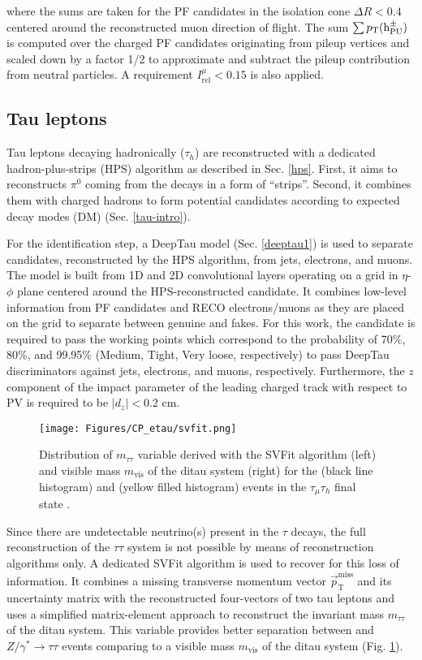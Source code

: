 where the sums are taken for the PF candidates in the isolation cone $\Delta R < 0.4$ centered around the reconstructed muon direction of flight. The sum $\sum p_{\text{T}}(\text{h}^\pm_{\text{PU}})$ is computed over the charged PF candidates originating from pileup vertices and scaled down by a factor 1/2 to approximate and subtract the pileup contribution from neutral particles. A requirement $I^\mu_{\text{rel}} < 0.15$ is also applied.  

\subsection{Tau leptons}\label{sec:reco_tau}
Tau leptons decaying hadronically ($\tau_h$) are reconstructed with a dedicated hadron-plus-strips (HPS) algorithm as described in Sec. \ref{hps}. First, it aims to reconstructs $\pi^0$ coming from the \tauh decays in a form of \enquote{strips}. Second, it combines them with charged hadrons to form potential \tauh candidates according to expected decay modes (DM) (Sec. \ref{tau-intro}).

For the identification step, a DeepTau model (Sec. \ref{deeptau1}) is used to separate \tauh candidates, reconstructed by the HPS algorithm, from jets, electrons, and muons. The model is built from 1D and 2D convolutional layers operating on a grid in $\eta$-$\phi$ plane centered around the HPS-reconstructed \tauh candidate. It combines low-level information from PF candidates and RECO electrons/muons as they are placed on the grid to  separate between genuine \tauh and fakes. For this work, the \tauh candidate is required to pass the working points which correspond to the probability of 70\%, 80\%, and 99.95\% (Medium, Tight, Very loose, respectively) to pass DeepTau discriminators against jets, electrons, and muons, respectively. Furthermore, the $z$ component of the impact parameter of the leading charged track with respect to PV is required to be $|d_z| < 0.2$ cm.

\begin{figure}[t!]
    \centering
    \texttt{[image: Figures/CP\_etau/svfit.png]}
    \caption{Distribution of $m_{\tau\tau}$ variable derived with the SVFit algorithm (left) and visible mass $m_\text{vis}$ of the ditau system (right) for the \htt (black line histogram) and \ztt (yellow filled histogram) events in the $\tau_\mu\tau_h$ final state \cite{Bianchini:2014vza}.}
    \label{fig:svfit}
\end{figure}

Since there are undetectable neutrino(s) present in the $\tau$ decays, the full reconstruction of the $\tau\tau$ system is not possible by means of \tauh reconstruction algorithms only. A dedicated SVFit algorithm \cite{Bianchini:2014vza} is used to recover for this loss of information. It combines a missing transverse momentum vector $\Vec{p}_\text{T}^\text{miss}$ and its uncertainty matrix with the reconstructed four-vectors of two tau leptons and uses a simplified matrix-element approach to reconstruct the invariant mass $m_{\tau\tau}$ of the ditau system. This variable provides better separation between \htt and $Z/\gamma^*\to\tau\tau$ events comparing to a visible mass $m_\text{vis}$ of the ditau system (Fig. \ref{fig:svfit}).    


